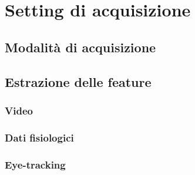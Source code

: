\chapter{Setting di acquisizione}

\section{Modalità di acquisizione}

\section{Estrazione delle feature}
\subsection{Video}
\subsection{Dati fisiologici}
\subsection{Eye-tracking}

\clearpage